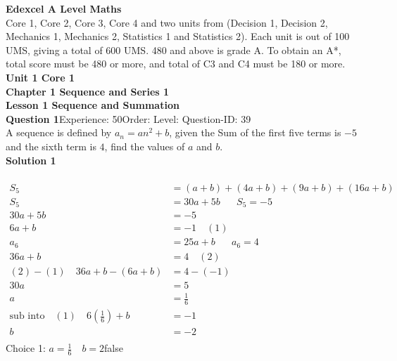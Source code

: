 \documentclass{article}
\begin{document}
\noindent\Huge{\textbf{Edexcel A Level Maths}}\\[5pt]
\noindent\large{Core 1, Core 2, Core 3, Core 4 and two units from (Decision 1, Decision 2, Mechanics 1, Mechanics 2, Statistics 1 and Statistics 2).  Each unit is out of 100 UMS, giving a total of 600 UMS.  480 and above is grade A.  To obtain an A*, total score must be 480 or more, and total of C3 and C4 must be 180 or more.}\\[20pt]
\noindent\huge{\textbf{Unit 1 Core 1}}\\[18pt]
\noindent\huge{\textbf{Chapter 1 Sequence and Series 1}}\\[15pt]
\noindent\huge{\textbf{Lesson 1 Sequence and Summation}}\\[12pt]
\noindent\textbf{Question 1}\hspace{20pt}Experience: 50\hspace{20pt}Order: \hspace{20pt}Level: \hspace{20pt}Question-ID: 39\\[2pt]
A sequence is defined by $a_n=an^2+b$, given the Sum of the first five terms is $-5$ and the sixth term is $4$, find the values of $a$ and $b$.\\[4pt]
\noindent\textbf{Solution 1}\\[2pt]
\\[-35pt]\begin{align*}
S_5&=(a+b)+(4a+b)+(9a+b)+(16a+b)\\[2pt]
S_5&=30a+5b\hspace{20pt} S_5=-5\\[2pt]
30a+5b&=-5\\[2pt]
6a+b&=-1\quad (1)\\[12pt]
a_6&=25a+b\hspace{20pt}a_6=4\\[2pt]
36a+b&=4\quad (2)\\[12pt]
(2)-(1)\quad 36a+b-(6a+b)&=4-(-1)\\[2pt]
30a&=5\\[2pt]
a&=\displaystyle\frac{1}{6}\\[12pt]
\text{sub into}\quad (1) \quad 6\left(\displaystyle\frac{1}{6}\right)+b&=-1\\[2pt]
b&=-2\\[2pt]
\end{align*}
Choice 1: \hspace{20pt}$a=\displaystyle\frac{1}{6}\quad b=2$\hspace{20pt}false\\
\end{document}
